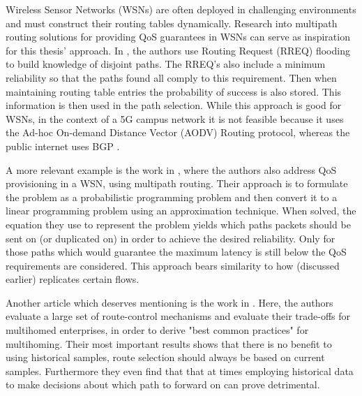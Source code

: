 Wireless Sensor Networks (WSNs) are often deployed in challenging environments and must construct their routing tables dynamically. Research into multipath routing solutions for providing QoS guarantees in WSNs can serve as inspiration for this thesis' approach. In \cite{alwan2010multi}, the authors use Routing Request (RREQ) flooding to build knowledge of disjoint paths. The RREQ's also include a minimum reliability so that the paths found all comply to this requirement. Then when maintaining routing table entries the probability of success is also stored. This information is then used in the path selection. While this approach is good for WSNs, in the context of a 5G campus network it is not feasible because it uses the Ad-hoc On-demand Distance Vector (AODV) Routing \cite{perkins2003rfc3561} protocol, whereas the public internet uses BGP \cite{rekhter2006border}.

A more relevant example is the work in \cite{huang2008multiconstrained}, where the authors also address QoS provisioning in a WSN, using multipath routing. Their approach is to formulate the problem as a probabilistic programming problem and then convert it to a linear programming problem using an approximation technique. When solved, the equation they use to represent the problem yields which paths packets should be sent on (or duplicated on) in order to achieve the desired reliability. Only for those paths which would guarantee the maximum latency is still below the QoS requirements are considered. This approach bears similarity to how \cite{prados2021asynchronous} (discussed earlier) replicates certain flows.

Another article which deserves mentioning is the work in \cite{akella2008performance}. Here, the authors evaluate a large set of route-control mechanisms and evaluate their trade-offs for multihomed enterprises, in order to derive "best common practices" for multihoming. Their most important results shows that there is no benefit to using historical samples, route selection should always be based on current samples. Furthermore they even find that that at times employing historical data to make decisions about which path to forward on can prove detrimental.


